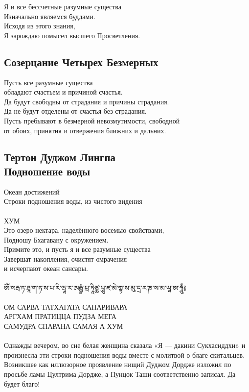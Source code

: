 Я и все бессчетные разумные существа\\
Изначально являемся буддами.\\
Исходя из этого знания,\\
Я зарождаю помысел высшего Просветления.\\
\normalsize
\subsection{Созерцание Четырех Безмерных}

Пусть все разумные существа \\ \indent обладают счастьем и причиной счастья.\\
Да будут свободны от страдания и причины страдания.\\
Да не будут отделены от счастья без страдания.\\
Пусть пребывают в безмерной невозмутимости, свободной \\ \indent
 от обоих, принятия и отвержения ближних и дальних.

\newpage %
\subsection{Тертон Дуджом Лингпа \\Подношение воды}

\large Океан достижений \\
\normalsize Строки подношения воды, из чистого видения\\
\\
ХУМ\\
Это озеро нектара, наделённого восемью свойствами,\\
Подношу Бхагавану с окружением.\\
Примите это, и пусть я и все разумные существа\\
Завершат накопления, очистят омрачения \\ \indent и исчерпают океан сансары.\\
\\
\ti
ཨོཾ་སརྦ་ཏ་ཐཱ་ག་ཏ་ས་པ་རི་ཝཱ་ར་ཨརྒྷཾ་པྲ་ཏཱིཙྪ་པཱུ་ཛ་མེ་གྷ་ས་མུ་དྲ་ར་ཎ་ས་མ་ཡཱ་ཨ་ཧཱུྃ༔\\
\\
\ru
ОМ САРВА ТАТХАГАТА САПАРИВАРА\\
АРГХАМ ПРАТИЦЦА ПУДЗА МЕГА \\
САМУДРА СПАРАНА САМАЯ А ХУМ\\
\\
\scriptsize
Однажды вечером, во сне белая женщина сказала «Я — дакини Сукхасиддхи»
и произнесла эти строки подношения воды вместе с молитвой о благе скитальцев.
Возникшее как иллюзорное проявление нищий Дуджом Дордже изложил
по просьбе ламы Цултрима Дордже, а Пунцок Таши соответственно записал.
Да будет благо!\normalsize

